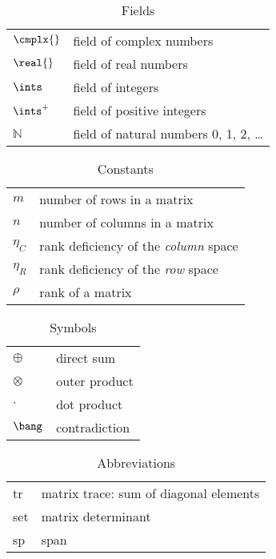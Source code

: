 \begin{table}[htbp]
\caption{Fields}
\begin{tabular}{ll}
%
  $\cmplx{}$ & field of complex numbers \\
%
  $\real{}$ & field of real numbers \\
%
  $\ints$ & field of integers \\
%
  $\ints^{+}$ & field of positive integers \\
%
  $\mathbb{N}$ & field of natural numbers 0, 1, 2, \dots
%
\end{tabular}
\label{tab:notation:fields}
\end{table}


\begin{table}[htbp]
\caption{Constants}
\begin{tabular}{ll}
%
  $m$ & number of rows in a matrix \\
%
  $n$ & number of columns in a matrix \\
%
  $\eta_{C}$ & rank deficiency of the \emph{column} space \\
%
  $\eta_{R}$ & rank deficiency of the \emph{row} space \\
%
  $\rho$ & rank of a matrix \\
%
\end{tabular}
\label{tab:notation:scalars}
\end{table}

\begin{table}[htbp]
\caption{Symbols}
\begin{tabular}{ll}
%
  $\oplus$ & direct sum \\
%
  $\otimes$ & outer product \\
%
  $\cdot$ & dot product \\
%
  $\bang$ & contradiction
%
\end{tabular}
\label{tab:notation:symbols}
\end{table}

\begin{table}[htbp]
\caption{Abbreviations}
\begin{tabular}{ll}
%
  tr & matrix trace: sum of diagonal elements \\
%
  set & matrix determinant \\
%
  sp & span \\
%
\end{tabular}
\label{tab:notation:abbreviations}
\end{table}

\endinput